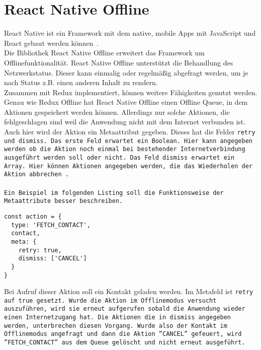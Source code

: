 \section{React Native Offline}
React Native ist ein Framework mit dem native, mobile Apps mit JavaScript und React gebaut werden können~\cite{rn}.\\
Die Bibliothek React Native Offline erweitert das Framework um Offlinefunktionalität.
React Native Offline unterstützt die Behandlung des Netzwerkstatus.
Dieser kann einmalig oder regelmäßig abgefragt werden, um je nach Status z.B. einen anderen Inhalt zu rendern.\\
Zusammen mit Redux implementiert, können weitere Fähigkeiten genutzt werden.
Genau wie Redux Offline hat React Native Offline einen Offline \gls{Queue}, in dem Aktionen gespeichert werden können.
Allerdings nur solche Aktionen, die fehlgeschlagen sind weil die Anwendung nicht mit dem Internet verbunden ist.
Auch hier wird der Aktion ein Metaattribut gegeben. Dieses hat die Felder \tt{retry} und \tt{dismiss}.
Das erste Feld erwartet ein Boolean. Hier kann angegeben werden ob die Aktion noch einmal bei bestehender Internetverbindung ausgeführt werden soll oder nicht.
Das Feld \tt{dismiss} erwartet ein Array. Hier können Aktionen angegeben werden, die das Wiederholen der Aktion abbrechen~\cite{rn-offline-gh}.\\\\
Ein Beispiel im folgenden Listing soll die Funktionsweise der Metaattribute besser beschreiben.
%
\begin{lstlisting}
const action = {
  type: 'FETCH_CONTACT',
  contact,
  meta: {
    retry: true,
    dismiss: ['CANCEL']
  }
}
\end{lstlisting}
%
Bei Aufruf dieser Aktion soll ein Kontakt geladen werden.
Im Metafeld ist \tt{retry} auf \tt{true} gesetzt.
Wurde die Aktion im Offlinemodus versucht auszuführen, wird sie erneut aufgerufen sobald die Anwendung wieder einen Internetzugang hat.
Die Aktionen die in \tt{dismiss} angegeben werden, unterbrechen diesen Vorgang.
Wurde also der Kontakt im Offlinemodus angefragt und dann die Aktion ''CANCEL'' gefeuert, wird ''FETCH\_CONTACT'' aus dem Queue gelöscht und nicht erneut ausgeführt.
